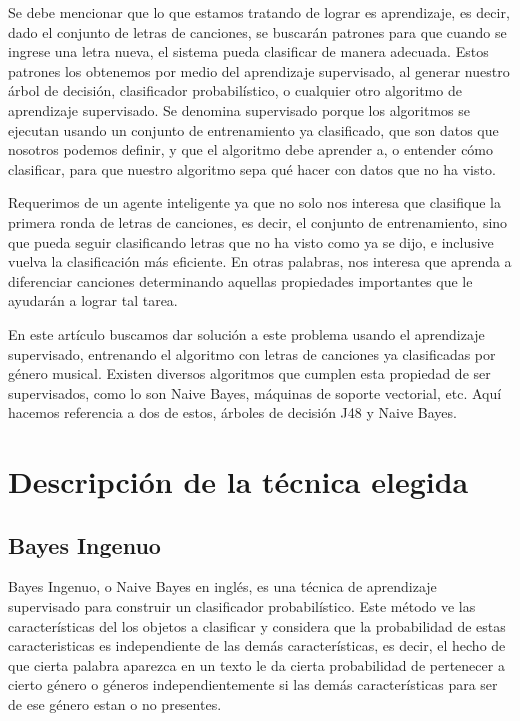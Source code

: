 \documentclass[spanish,11pt,letterpaper]{article}
\begin{document}
Se debe mencionar que lo que estamos tratando de lograr es aprendizaje, es decir, dado el conjunto
de letras de canciones, se buscarán patrones para que cuando se ingrese una letra nueva, el sistema
pueda clasificar de manera adecuada. Estos patrones los obtenemos por medio del aprendizaje
supervisado, al generar nuestro árbol de decisión, clasificador probabilístico,
o cualquier otro algoritmo de aprendizaje
supervisado. Se denomina supervisado porque los algoritmos se ejecutan usando un conjunto de
entrenamiento ya clasificado, que son datos que nosotros podemos definir, y que el algoritmo debe
aprender a, o entender cómo clasificar, para que nuestro algoritmo sepa qué hacer con datos
que no ha visto.

Requerimos de un agente inteligente ya que no solo nos interesa que clasifique la primera
ronda de letras de canciones, es decir, el conjunto de entrenamiento, sino que pueda seguir
clasificando letras que no ha visto como ya se dijo, e inclusive vuelva la clasificación
más eficiente. En otras palabras, nos interesa que aprenda a diferenciar canciones determinando
aquellas propiedades importantes que le ayudarán a lograr tal tarea.

En este artículo buscamos dar solución a este problema usando el aprendizaje supervisado, entrenando
el algoritmo con letras de canciones ya clasificadas por género musical. Existen
diversos algoritmos que cumplen esta propiedad de ser supervisados, como lo son Naive
Bayes, máquinas de soporte vectorial, etc. Aquí hacemos referencia a dos de estos,
árboles de decisión J48 y Naive Bayes.

\section{Descripción de la técnica elegida}

\subsection{Bayes Ingenuo}

Bayes Ingenuo, o Naive Bayes en inglés, es una técnica de aprendizaje supervisado para construir un
clasificador probabilístico. Este método ve las características del los objetos a clasificar y considera que la
probabilidad de estas caracteristicas es independiente de las demás características, es decir, el
hecho de que cierta palabra aparezca en un texto le da cierta probabilidad de pertenecer a cierto
género o géneros independientemente si las demás características para ser de ese género estan o no
presentes.
\end{document}
